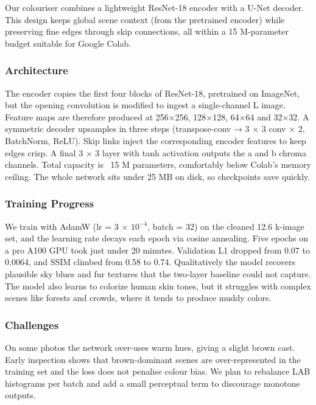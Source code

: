 \documentclass{article} %
\begin{document}
Our colouriser combines a lightweight ResNet-18 encoder with a U-Net decoder. This design keeps global scene context (from the pretrained encoder) while preserving fine edges through skip connections, all within a 15 M-parameter budget suitable for Google Colab.

\subsubsection{Architecture}

The encoder copies the first four blocks of ResNet-18, pretrained on ImageNet, but the opening convolution is modified to ingest a single-channel L image. Feature maps are therefore produced at 256×256, 128×128, 64×64 and 32×32.
A symmetric decoder upsamples in three steps (transpose-conv → 3 × 3 conv × 2, BatchNorm, ReLU). Skip links inject the corresponding encoder features to keep edges crisp. A final 3 × 3 layer with tanh activation outputs the a and b chroma channels. Total capacity is ~15 M parameters, comfortably below Colab’s memory ceiling. The whole network sits under 25 MB on disk, so checkpoints save quickly.

\subsubsection{Training Progress}

We train with AdamW (lr = 3 × $10^{-4}$, batch = 32) on the cleaned 12.6 k-image set, and the learning rate decays each epoch via cosine annealing. Five epochs on a pro A100 GPU took just under 20 minutes. Validation L1 dropped from 0.07 to 0.0064, and SSIM climbed from 0.58 to 0.74. Qualitatively the model recovers plausible sky blues and fur textures that the two-layer baseline could not capture. The model also learns to colorize human skin tones, but it struggles with complex scenes like forests and crowds, where it tends to produce muddy colors.

\subsubsection{Challenges}

On some photos the network over-uses warm hues, giving a slight brown cast. Early inspection shows that brown-dominant scenes are over-represented in the training set and the loss does not penalise colour bias. We plan to rebalance LAB histograms per batch and add a small perceptual term to discourage monotone outputs.
\end{document}
